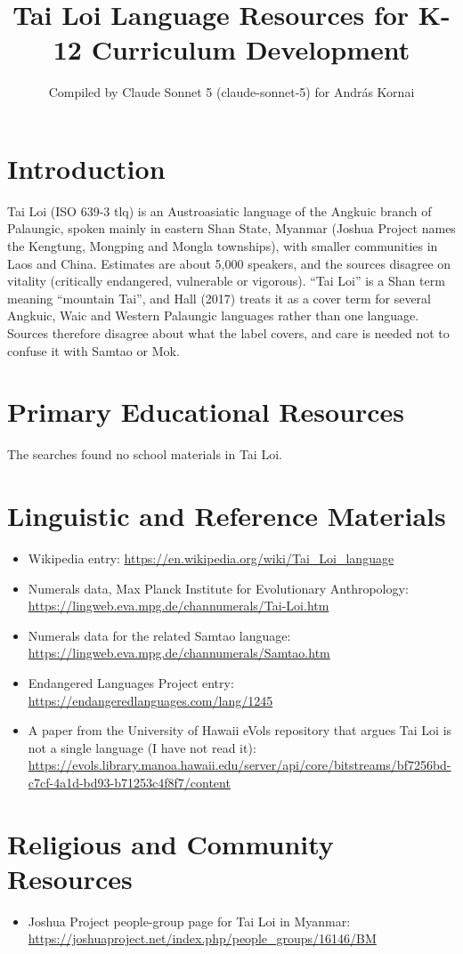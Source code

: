 \documentclass[12pt]{article}
\title{Tai Loi Language Resources for K-12 Curriculum Development}
\author{Compiled by Claude Sonnet 5 (claude-sonnet-5) for Andr\'as Kornai}
\date{}
\begin{document}
\maketitle

\section{Introduction}
Tai Loi (ISO 639-3 tlq) is an Austroasiatic language of the Angkuic branch of Palaungic, spoken mainly in eastern Shan State, Myanmar (Joshua Project names the Kengtung, Mongping and Mongla townships), with smaller communities in Laos and China. Estimates are about 5,000 speakers, and the sources disagree on vitality (critically endangered, vulnerable or vigorous). ``Tai Loi'' is a Shan term meaning ``mountain Tai'', and Hall (2017) treats it as a cover term for several Angkuic, Waic and Western Palaungic languages rather than one language. Sources therefore disagree about what the label covers, and care is needed not to confuse it with Samtao or Mok.

\section{Primary Educational Resources}
The searches found no school materials in Tai Loi.

\section{Linguistic and Reference Materials}
\begin{itemize}
\item Wikipedia entry: \url{https://en.wikipedia.org/wiki/Tai_Loi_language}
\item Numerals data, Max Planck Institute for Evolutionary Anthropology: \url{https://lingweb.eva.mpg.de/channumerals/Tai-Loi.htm}
\item Numerals data for the related Samtao language: \url{https://lingweb.eva.mpg.de/channumerals/Samtao.htm}
\item Endangered Languages Project entry: \url{https://endangeredlanguages.com/lang/1245}
\item A paper from the University of Hawaii eVols repository that argues Tai Loi is not a single language (I have not read it): \url{https://evols.library.manoa.hawaii.edu/server/api/core/bitstreams/bf7256bd-c7cf-4a1d-bd93-b71253c4f8f7/content}
\end{itemize}

\section{Religious and Community Resources}
\begin{itemize}
\item Joshua Project people-group page for Tai Loi in Myanmar: \url{https://joshuaproject.net/index.php/people_groups/16146/BM}
\end{itemize}
\end{document}
